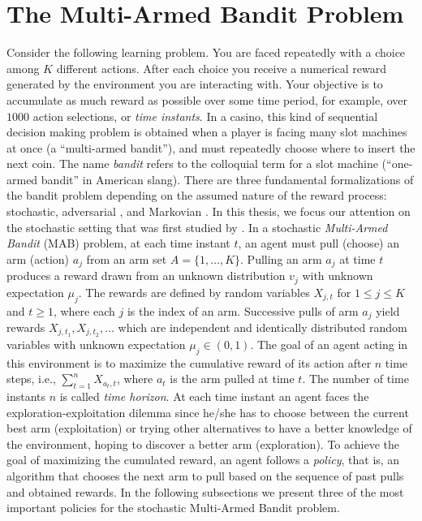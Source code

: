 \section{The Multi-Armed Bandit Problem}
Consider the following learning problem. You are faced repeatedly with a choice among $K$ different  actions. After each choice you receive a numerical reward generated by the environment you are interacting with. Your objective is to accumulate as much reward as possible over some time period, for example, over $1000$ action selections, or \emph{time instants}. In a
casino, this kind of sequential decision making problem is obtained when a player is
facing many slot machines at once (a “multi-armed bandit”), and must
repeatedly choose where to insert the next coin. The name \emph{bandit} refers to the colloquial
term for a slot machine (“one-armed bandit” in American slang).
There are three fundamental formalizations of the bandit problem
depending on the assumed nature of the reward process: stochastic, adversarial \citep{Auer1995Adversarial}, and Markovian \citep{Anantharam1987Markovian}. In this thesis, we focus our attention on the stochastic setting that was first studied by \cite{Robbins1952sequential}. In a stochastic \emph{Multi-Armed Bandit} (MAB) problem, at each time instant $t$, an agent must pull (choose) an arm (action) $a_j$ from an arm set $A = \{1,\dots,K\}$. Pulling an arm $a_j$ at time $t$ produces a reward drawn from an unknown distribution $v_j$ with unknown expectation $\mu_j$. The rewards are defined by random variables $X_{j,t}$ for $1\leq j \leq K$ and  $ t \geq 1$, where each $j$ is the index of an arm. Successive pulls of arm $a_j$ yield rewards $X_{j,t_1},X_{j,t_2},\dots$ which are independent and identically distributed random variables with unknown expectation $\mu_j \in (0,1)$. The goal of an agent acting in this environment is to maximize the cumulative reward of its action after $n$ time steps, i.e., $\sum_{t=1}^{n} X_{a_t,t}$, where $a_t$ is the arm pulled at time $t$. The number of time instants $n$ is called \emph{time horizon}. At each time instant an agent faces the exploration-exploitation dilemma since he/she has to choose between the current best arm (exploitation) or trying other alternatives to have a better knowledge of the environment, hoping to discover a better arm (exploration). To achieve the goal of maximizing the cumulated reward, an agent follows a \emph{policy}, that is, an algorithm that chooses the next arm to pull based on the sequence of past pulls and obtained rewards. In the following subsections we present three of the most important policies for the stochastic Multi-Armed Bandit problem.

